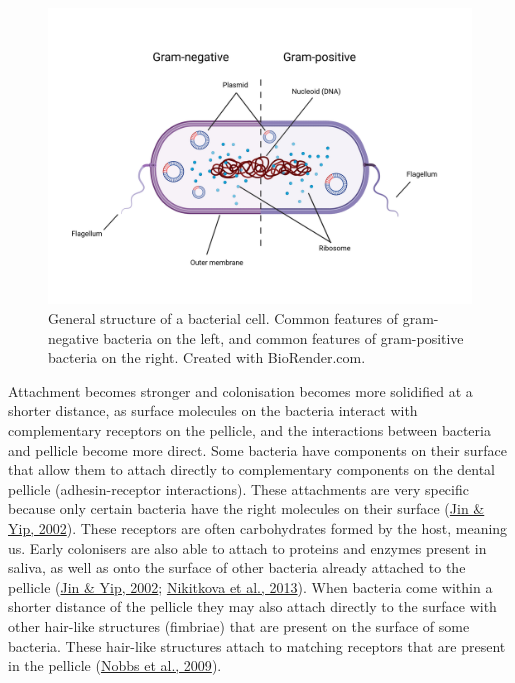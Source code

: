 \documentclass[
  b5paper,
]{book}
\begin{document}
\begin{figure}

{\centering \includegraphics{figures/bacterial-structure.png}

}

\caption{\label{fig-bacterial-structure}General structure of a bacterial
cell. Common features of gram-negative bacteria on the left, and common
features of gram-positive bacteria on the right. Created with
BioRender.com.}

\end{figure}

Attachment becomes stronger and colonisation becomes more solidified at
a shorter distance, as surface molecules on the bacteria interact with
complementary receptors on the pellicle, and the interactions between
bacteria and pellicle become more direct. Some bacteria have components
on their surface that allow them to attach directly to complementary
components on the dental pellicle (adhesin-receptor interactions). These
attachments are very specific because only certain bacteria have the
right molecules on their surface
(\protect\hyperlink{ref-jinSupragingivalCalculus2002}{Jin \& Yip,
2002}). These receptors are often carbohydrates formed by the host,
meaning us. Early colonisers are also able to attach to proteins and
enzymes present in saliva, as well as onto the surface of other bacteria
already attached to the pellicle
(\protect\hyperlink{ref-jinSupragingivalCalculus2002}{Jin \& Yip, 2002};
\protect\hyperlink{ref-nikitkovaStarchBiofilms2013}{Nikitkova et al.,
2013}). When bacteria come within a shorter distance of the pellicle
they may also attach directly to the surface with other hair-like
structures (fimbriae) that are present on the surface of some bacteria.
These hair-like structures attach to matching receptors that are present
in the pellicle
(\protect\hyperlink{ref-nobbsStreptococcusAdherence2009}{Nobbs et al.,
2009}).
\end{document}
